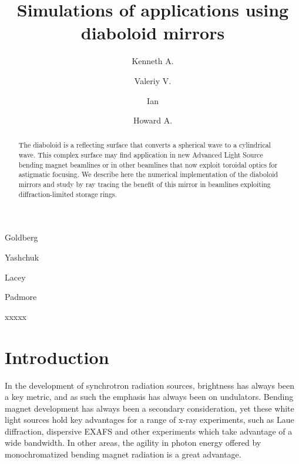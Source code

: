 \documentclass{iucr}       %
\begin{document}




\title{Simulations of applications using diaboloid mirrors}

\author[a]{Kenneth A.}{Goldberg}
\author[a]{Valeriy V.}{Yashchuk}
\author[a]{Ian}{Lacey}
\author[a]{Howard A.}{Padmore}




\begin{synopsis}
xxxxx
\end{synopsis}

\begin{abstract}
The diaboloid is a reflecting surface that converts a spherical wave to a cylindrical wave. This complex surface may find application in new Advanced Light Source bending magnet beamlines or in other beamlines that now exploit toroidal optics for astigmatic focusing. We describe here the numerical implementation of the diaboloid mirrors and study by ray tracing the benefit of this mirror in beamlines exploiting diffraction-limited storage rings.
\end{abstract}

\section{Introduction}

In the development of synchrotron radiation sources, brightness has always been a key metric, and as such the emphasis has always been on undulators. Bending magnet development has always been a secondary consideration, yet these white light sources hold key advantages for a range of x-ray experiments, such as Laue diffraction, dispersive EXAFS and other experiments which take advantage of a wide bandwidth. In other areas, the agility in photon energy offered by monochromatized bending magnet radiation is a great advantage. 
\end{document}
